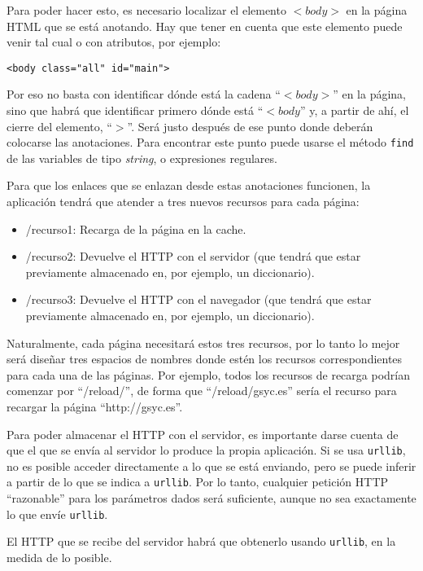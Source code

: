 Para poder hacer esto, es necesario localizar el elemento $<body>$ en la página HTML que se está anotando. Hay que tener en cuenta que este elemento puede venir tal cual o con atributos, por ejemplo:

\begin{verbatim}
<body class="all" id="main">
\end{verbatim}

Por eso no basta con identificar dónde está la cadena ``$<body>$'' en la página, sino que habrá que identificar primero dónde está ``$<body$'' y, a partir de ahí, el cierre del elemento, ``$>$''. Será justo después de ese punto donde deberán colocarse las anotaciones. Para encontrar este punto puede usarse el método \texttt{find} de las variables de tipo \emph{string}, o expresiones regulares.

Para que los enlaces que se enlazan desde estas anotaciones funcionen, la aplicación tendrá que atender a tres nuevos recursos para cada página:

\begin{itemize}
\item /recurso1: Recarga de la página en la cache.
\item /recurso2: Devuelve el HTTP con el servidor (que tendrá que estar previamente almacenado en, por ejemplo, un diccionario).
\item /recurso3: Devuelve el HTTP con el navegador (que tendrá que estar previamente almacenado en, por ejemplo, un diccionario).
\end{itemize}

Naturalmente, cada página necesitará estos tres recursos, por lo tanto lo mejor será diseñar tres espacios de nombres donde estén los recursos correspondientes para cada una de las páginas. Por ejemplo, todos los recursos de recarga podrían comenzar por ``/reload/'', de forma que ``/reload/gsyc.es'' sería el recurso para recargar la página ``http://gsyc.es''.

Para poder almacenar el HTTP con el servidor, es importante darse cuenta de que el que se envía al servidor lo produce la propia aplicación. Si se usa \texttt{urllib}, no es posible acceder directamente a lo que se está enviando, pero se puede inferir a partir de lo que se indica a \texttt{urllib}. Por lo tanto, cualquier petición HTTP ``razonable'' para los parámetros dados será suficiente, aunque no sea exactamente lo que envíe \texttt{urllib}.

El HTTP que se recibe del servidor habrá que obtenerlo usando \texttt{urllib}, en la medida de lo posible.

